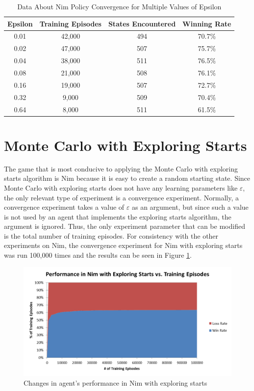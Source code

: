 \documentclass[11pt,a4paper]{report}
\begin{document}
\begin{table}[ht]
	\centering
	\begin{tabular}{c c c c}
		Epsilon & Training Episodes & States Encountered & Winning Rate \\
		\hline
		0.01 & 42,000 & 494 & 70.7\% \\
		0.02  & 47,000 & 507 & 75.7\% \\
		0.04  & 38,000 & 511 & 76.5\% \\
		0.08  & 21,000 & 508 & 76.1\% \\
		0.16  & 19,000 & 507 & 72.7\% \\
		0.32  & 9,000 & 509 & 70.4\% \\
		0.64 & 8,000 & 511 & 61.5\% \\
	\end{tabular}
	\caption{Data About Nim Policy Convergence for Multiple Values of Epsilon}
	\label{table:nim_convergence_table}
\end{table}


\section{Monte Carlo with Exploring Starts}

The game that is most conducive to applying the Monte Carlo with exploring starts algorithm is Nim because it is easy to create a random starting state. Since Monte Carlo with exploring starts does not have any learning parameters like $\varepsilon$, the only relevant type of experiment is a convergence experiment. Normally, a convergence experiment takes a value of $\varepsilon$ as an argument, but since such a value is not used by an agent that implements the exploring starts algorithm, the argument is ignored. Thus, the only experiment parameter that can be modified is the total number of training episodes. For consistency with the other experiments on Nim, the convergence experiment for Nim with exploring starts was run 100,000 times and the results can be seen in Figure \ref{nim-exploring-starts-convergence}.

\begin{figure}[htbp]
	\begin{center}
		\includegraphics[width=125mm]{NimExploringStarts_Convergence.png}
		\caption{Changes in agent's performance in Nim with exploring starts}
		\label{nim-exploring-starts-convergence}
	\end{center}
\end{figure}
\end{document}
